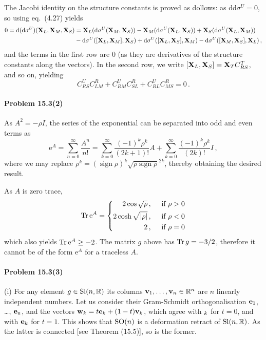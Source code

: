 \documentclass[a4paper,12pt]{article}
\def\d{\mathrm{d}}
\def\e{\mathrm{e}}
\def\sign{\mathop{\text{sign}}}
\def\Tr{\ensuremath{\mathop{\rm Tr}}}
\newcommand{\problem}[1]{\paragraph{Problem #1}}
\begin{document}
The Jacobi identity on the structure constants is proved as dollows: as $\d\d\sigma^U = 0$, so using eq.\ (4.27) yields
\[\begin{aligned}
 0 = \d(\d\sigma^U)({\bf X}_L, {\bf X}_M, {\bf X}_S) &= 
 {\bf X}_L(\d\sigma^U({\bf X}_M, {\bf X}_S)) -{\bf  X}_M (\d\sigma^U({\bf X}_L, {\bf X}_S)) + {\bf X}_S(\d\sigma^U({\bf X}_L, {\bf X}_M))\\
 &-\d\sigma^U([{\bf X}_L, {\bf X}_M], {\bf X}_S) + \d\sigma^U([{\bf X}_L,{\bf X}_S], {\bf X}_M) -\d\sigma^U([{\bf X}_M,{\bf X}_S], {\bf X}_L)\,,
\end{aligned}
\]
and the terms in the first row are 0 (as they are derivatives of the structure constants along the vectors). In the second row, we write $[{\bf X}_L, {\bf X}_S] = {\bf X}_T C^T_{RS}$, and so on,
yielding
\[
 C^U_{RS}C^R_{LM} + C^U_{RM}C^R_{SL} + C^U_{RL}C^R_{MS} = 0\,.
\]



\problem{15.3(2)} As $A^2=-\rho I$, the series of the exponential can be separated into odd and even terms as
\[
 \e^A = \sum_{n=0}^\infty \frac{A^n}{n!} = \sum_{k=0}^\infty \frac{(-1)^k \rho^k}{(2k+1)!} A + \sum_{k=0}^\infty \frac{(-1)^k \rho^k}{(2k)!} I\,,
\]
where we may replace $\rho^k = (\sign \rho)^k \sqrt{\rho \sign \rho }^{2k}$, thereby obtaining the desired result.

As $A$ is zero trace,
\[
 \Tr \e^A = \left\{
 \begin{aligned}
  2\cos\sqrt\rho&\,,\quad\text{\ if $\rho > 0$}\\
  2\cosh\sqrt{|\rho|}&\,,\quad\text{\ if $\rho < 0$}\\
  2&\,,\quad\text{\ if $\rho = 0$}\\
 \end{aligned}
 \right.
\]
which also yields $\Tr \e^A \ge -2$. The matrix $g$ above has $\Tr g = -3/2$, therefore it cannot be of the form $\e^A$ for a traceless $A$.


\problem{15.3(3)} (i) For any element $g\in {\rm Sl}(n, \mathbb{R})$ its columns ${\bf v}_1, \dots, {\bf v}_n\in \mathbb{R}^n$ are $n$ linearly independent numbers. Let us consider their Gram-Schmidt orthogonalisation ${\bf e}_1$, \dots, ${\bf e}_n$, and the vectors ${\bf w}_k = t {\bf e}_k + (1-t) {\bf v}_k$, which agree with ${\bf }_k$ for $t=0$, and with ${\bf e}_k$ for $t=1$. This shows that ${\rm SO}(n)$ is a deformation retract of ${\rm Sl}(n, \mathbb{R})$. As the latter is connected [see Theorem (15.5)], so is the former.
\end{document}
